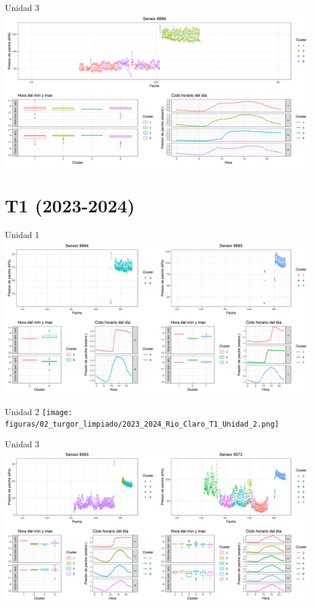 \documentclass[
  letterpaper,
  DIV=11,
  numbers=noendperiod]{scrreprt}
\begin{document}
Unidad 3
\includegraphics{figuras/02_turgor_limpiado/2022_2023_Rio_Claro_T4_Unidad_3.png}

\chapter{T1 (2023-2024)}

Unidad 1
\includegraphics{figuras/02_turgor_limpiado/2023_2024_Rio_Claro_T1_Unidad_1.png}

Unidad 2
\texttt{[image: figuras/02\_turgor\_limpiado/2023\_2024\_Rio\_Claro\_T1\_Unidad\_2.png]}

Unidad 3
\includegraphics{figuras/02_turgor_limpiado/2023_2024_Rio_Claro_T1_Unidad_3.png}
\end{document}
